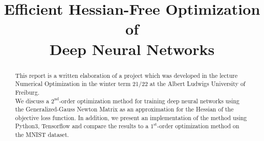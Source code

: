 \documentclass[conference]{IEEEtran}
\begin{document}
	\title{Efficient Hessian-Free Optimization of \\Deep Neural Networks}


	\author{
		\and
		\and
	}

	\maketitle
	\thispagestyle{plain}
	\pagestyle{plain}

	\begin{abstract}
		\noindent
		This report is a written elaboration of a project which was developed in the lecture Numerical Optimization in the winter term 21/22 at the Albert Ludwigs University of Freiburg.\\
		We discuss a $2^{\text{nd}}$-order optimization method for training deep neural networks using the Generalized-Gauss Newton Matrix as an approximation for the Hessian of the objective loss function. 
		In addition, we present an implementation of the method using Python3, Tensorflow and compare the results to a $1^{\text{st}}$-order optimization method on the MNIST dataset.
	\end{abstract}
\end{document}
